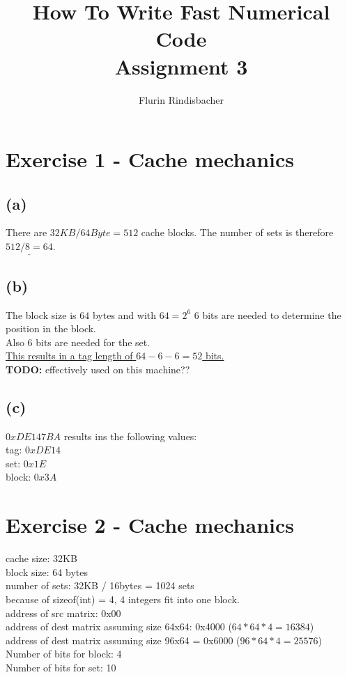 \documentclass[10pt,a4paper,oneside,notitlepage]{report}
\author{Flurin Rindisbacher}
\title{How To Write Fast Numerical Code \\ \vspace{6 mm} \textbf{Assignment 3}}
\begin{document}
\maketitle

\section*{Exercise 1 - Cache mechanics}
\subsection*{(a)}
There are $32KB / 64 Byte = 512$ cache blocks. The number of sets is therefore $\underline{512 / 8=64}$.

\subsection*{(b)}
The block size is $64$ bytes and with $64=2^6$ 6 bits are needed to determine the position in the block. \\
Also 6 bits are needed for the set. \\
\underline{This results in a tag length of $64 - 6 - 6=52$ bits.}
\\
\textbf{TODO:} effectively used on this machine??

\subsection*{(c)}
$0xDE147BA$ results ins the following values: \\
tag: $0xDE14$ \\
set: $0x1E$ \\
block: $0x3A$

\section*{Exercise 2 - Cache mechanics}
cache size: 32KB \\
block size: 64 bytes \\
number of sets: 32KB / 16bytes = 1024 sets \\
because of sizeof(int) = 4, 4 integers fit into one block. \\
address of src matrix: 0x00 \\
address of dest matrix assuming size 64x64: 0x4000 ($64*64*4=16384$) \\
address of dest matrix assuming size 96x64 = 0x6000 ($96*64*4=25576$) \\
Number of bits for block: 4 \\
Number of bits for set: 10\\
\end{document}
